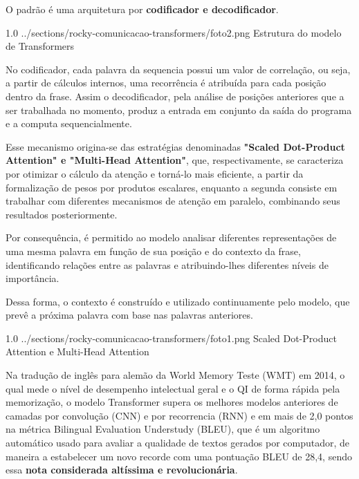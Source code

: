 {\subtitle{Mas como funcionam?}
    \hspace{1cm}O padrão é uma arquitetura por \textbf{codificador e decodificador}. 

    \articleimage
    {1.0}
    {../sections/rocky-comunicacao-transformers/foto2.png}
    {Estrutura do modelo de Transformers}

    \hspace{1cm}No codificador, cada palavra da sequencia possui um valor de correlação, ou seja, 
    a partir de cálculos internos, uma recorrência é atribuída para cada posição dentro da frase. Assim o decodificador, pela análise de posições anteriores que a ser trabalhada
    no momento, produz a entrada em conjunto da saída do programa e a computa sequencialmente. 

    \hspace{1cm}Esse mecanismo origina-se das estratégias denominadas \textbf{"Scaled Dot-Product Attention" e "Multi-Head Attention"}, que, respectivamente, se caracteriza por otimizar o cálculo
    da atenção e torná-lo mais eficiente, a partir da formalização de pesos por produtos escalares, enquanto a segunda consiste em trabalhar com diferentes mecanismos de atenção em paralelo,
    combinando seus resultados posteriormente. 

    \hspace{1cm}Por consequência, é permitido ao modelo analisar diferentes representações de uma mesma palavra em função de sua posição e do contexto da frase, identificando relações entre 
    as palavras e atribuindo-lhes diferentes níveis de importância. 
    
    \hspace{1cm}Dessa forma, o contexto é construído e utilizado continuamente pelo modelo, que prevê a próxima palavra com base nas palavras anteriores.

    \articleimage
    {1.0}
    {../sections/rocky-comunicacao-transformers/foto1.png}
    {Scaled Dot-Product Attention e Multi-Head Attention}

\subtitle{Resultados}
    \hspace{1cm} Na tradução de inglês para alemão da World Memory Teste (WMT) em 2014, o qual mede o nível de desempenho intelectual geral e o QI de forma rápida pela memorização, o modelo Transformer
    supera os melhores modelos anteriores de camadas por convolução (CNN) e por recorrencia (RNN) e em mais de 2,0 pontos na métrica Bilingual Evaluation Understudy (BLEU), que é um algoritmo automático usado para avaliar
    a qualidade de textos gerados por computador, de maneira a estabelecer um novo recorde com uma pontuação BLEU de 28,4, sendo essa \textbf{nota considerada altíssima e revolucionária}.

}
